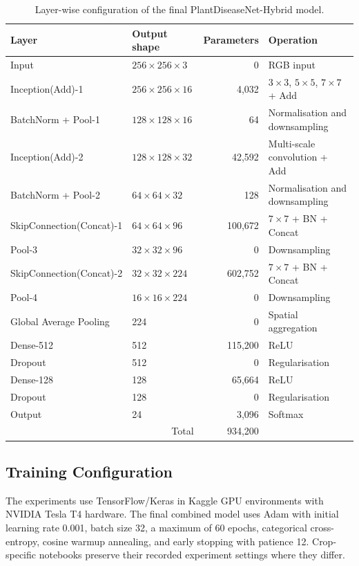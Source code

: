 \documentclass[a4paper,fleqn]{cas-dc}
\begin{document}
\begin{table}[!t]
\centering
\caption{Layer-wise configuration of the final PlantDiseaseNet-Hybrid model.}
\label{tab:model}
\begin{tabular}{p{3.3cm}p{3.5cm}r p{5.0cm}}
\toprule
Layer & Output shape & Parameters & Operation \\
\midrule
Input & $256\times256\times3$ & 0 & RGB input \\
Inception(Add)-1 & $256\times256\times16$ & 4,032 & $3\times3$, $5\times5$, $7\times7$ + Add \\
BatchNorm + Pool-1 & $128\times128\times16$ & 64 & Normalisation and downsampling \\
Inception(Add)-2 & $128\times128\times32$ & 42,592 & Multi-scale convolution + Add \\
BatchNorm + Pool-2 & $64\times64\times32$ & 128 & Normalisation and downsampling \\
SkipConnection(Concat)-1 & $64\times64\times96$ & 100,672 & $7\times7$ + BN + Concat \\
Pool-3 & $32\times32\times96$ & 0 & Downsampling \\
SkipConnection(Concat)-2 & $32\times32\times224$ & 602,752 & $7\times7$ + BN + Concat \\
Pool-4 & $16\times16\times224$ & 0 & Downsampling \\
Global Average Pooling & 224 & 0 & Spatial aggregation \\
Dense-512 & 512 & 115,200 & ReLU \\
Dropout & 512 & 0 & Regularisation \\
Dense-128 & 128 & 65,664 & ReLU \\
Dropout & 128 & 0 & Regularisation \\
Output & 24 & 3,096 & Softmax \\
\midrule
\multicolumn{2}{r}{Total} & 934,200 & \\
\bottomrule
\end{tabular}
\end{table}

\subsection{Training Configuration}
The experiments use TensorFlow/Keras in Kaggle GPU environments with NVIDIA Tesla T4 hardware. The final combined model uses Adam with initial learning rate 0.001, batch size 32, a maximum of 60 epochs, categorical cross-entropy, cosine warmup annealing, and early stopping with patience 12. Crop-specific notebooks preserve their recorded experiment settings where they differ.
\end{document}
